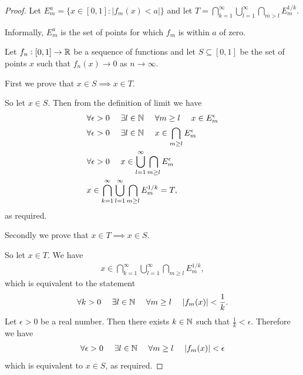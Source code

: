 \begin{proof}
  Let $E_m^a = \{x \in [0, 1] : |f_m(x) < a|\}$ and let $T = \bigcap_{k=1}^\infty \bigcup_{l=1}^\infty \bigcap_{m > l} E_m^{1/k}$.

  Informally, $E_m^a$ is the set of points for which $f_m$ is within $a$ of zero.

  Let $f_n: [0, 1] \to \mathbb{R}$ be a sequence of functions and let $S \subseteq [0, 1]$ be the set of points $x$
  such that $f_n(x) \to 0$ as $n \to \infty$.

  First we prove that $x \in S \implies x \in T$.

  So let $x \in S$. Then from the definition of limit we have
  \begin{align*}
    &\forall \epsilon>0 ~~~~ \exists l \in \mathbb{N} ~~~~ \forall m \geq l ~~~~  x \in E_m^\epsilon \\
    &\forall \epsilon>0 ~~~~ \exists l \in \mathbb{N} ~~~~                        x \in \bigcap_{m \geq l} E_m^\epsilon \\
    &\forall \epsilon>0 ~~~~                                              x \in \bigcup_{l=1}^\infty \bigcap_{m \geq l} E_m^\epsilon \\
    &                                                              x \in \bigcap_{k=1}^\infty \bigcup_{l=1}^\infty \bigcap_{m \geq l} E_m^{1/k} = T,
  \end{align*}
  as required.

  Secondly we prove that $x \in T \implies x \in S$.

  So let $x \in T$. We have
  \begin{align*}
    x \in \bigcap_{k=1}^\infty \bigcup_{l=1}^\infty \bigcap_{m \geq l} E_m^{1/k},
  \end{align*}
  which is equivalent to the statement
  \begin{align*}
    \forall k>0 ~~~~ \exists l \in \mathbb{N} ~~~~ \forall m \geq l ~~~~  |f_m(x)| < \frac{1}{k}.
  \end{align*}
  Let $\epsilon > 0$ be a real number. Then there exists $k \in \mathbb{N}$ such that $\frac{1}{k} < \epsilon$. Therefore we have
  \begin{align*}
    \forall \epsilon>0 ~~~~ \exists l \in \mathbb{N} ~~~~ \forall m \geq l ~~~~  |f_m(x)| < \epsilon
  \end{align*}
  which is equivalent to $x \in S$, as required.
\end{proof}

